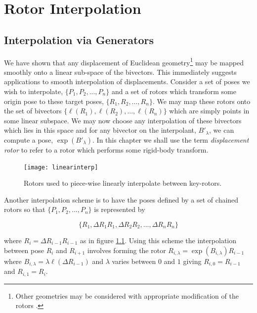 \begin{savequote}
\end{savequote}

\chapter{Rotor Interpolation}

\section{Interpolation via Generators}

We have shown that any displacement of Euclidean geometry\footnote{Other
  geometries may be considered with appropriate modification of the rotors
          \cite{GA:CUEDTechRep}.} 
may be mapped smoothly onto a linear sub-space of the bivectors. This
immediately suggests applications to smooth interpolation of displacements.
Consider a set of poses we wish to interpolate, $\{P_1, P_2, ..., P_n\}$ and a
set of rotors which transform some origin pose to these target poses, $\{R_1,
    R_2, ..., R_n\}$. We may map these rotors onto the set of bivectors
    $\{\ell(R_1), \ell(R_2), ..., \ell(R_n)\}$ which are simply points in some
    linear subspace. We may now choose any interpolation of these bivectors
    which lies in this space and for any bivector on the interpolant,
    $B'_\lambda$, we can compute a pose, $\exp(B'_\lambda)$.
    In this chapter we shall use the term \emph{displacement rotor} to refer to
a rotor which performs some rigid-body transform.

\begin{figure}\centering
\texttt{[image: linearinterp]}
\caption{\label{fig:linearinterp}Rotors used to piece-wise linearly interpolate between key-rotors.}
\end{figure}

Another interpolation scheme is to have the poses defined by a set of chained rotors so that
$\{P_1, P_2, ..., P_n\}$ is represented by 

\[\{R_1, \Delta R_1R_1, \Delta R_2 R_2, ..., \Delta R_n R_n\}\]

where $R_i = \Delta R_{i-1} R_{i-1}$ as in figure \ref{fig:linearinterp}. Using
this scheme the interpolation between pose $R_i$ and $R_{i+1}$ involves forming
the rotor $R_{i,\lambda} = \exp(B_{i,\lambda})R_{i-1}$ where $B_{i,\lambda} =
\lambda \ell(\Delta R_{i-1})$ and $\lambda$ varies between $0$ and $1$ giving
$R_{i,0} = R_{i-1}$ and $R_{i,1} = R_i$.

